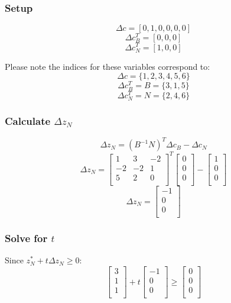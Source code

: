 \documentclass[14pt]{extarticle}
\begin{document}
\subsubsection*{Setup}
\[
    \Delta c = [0, 1, 0, 0, 0, 0]
\]
\[
    \Delta c^T_B = [0, 0, 0]
\]
\[
    \Delta c^T_N = [1, 0, 0]
\]

\bigskip Please note the indices for these variables correspond to:
\[
    \Delta c = \{1, 2, 3, 4, 5, 6\}
\]
\[
    \Delta c^T_B = B = \{3, 1, 5\}
\]
\[
    \Delta c^T_N = N = \{2, 4, 6\}
\]

\subsubsection*{Calculate $\Delta z_N$}
\[
    \Delta z_N = (B^{-1}N)^T \Delta c_B - \Delta c_N
\]
\[
    \Delta z_N = \begin{bmatrix}
        1 & 3 & -2 \\
        -2 & -2 & 1 \\
        5 & 2 & 0 \\
    \end{bmatrix}^T
    \begin{bmatrix}
        0 \\
        0 \\
        0 \\
    \end{bmatrix}
    - \begin{bmatrix}
        1 \\
        0 \\
        0 \\
    \end{bmatrix}
\]
\[
    \Delta z_N = \begin{bmatrix}
        -1 \\
        0 \\
        0 \\
    \end{bmatrix}
\]

\subsubsection*{Solve for $t$}
Since $z^*_N + t\Delta z_N \geq 0$:
\[
    \begin{bmatrix}
        3 \\
        1 \\
        1 \\
    \end{bmatrix}
    + t \begin{bmatrix}
        -1 \\
        0 \\
        0 \\
    \end{bmatrix}
    \geq \begin{bmatrix}
        0 \\
        0 \\
        0 \\
    \end{bmatrix}
\]
\end{document}
